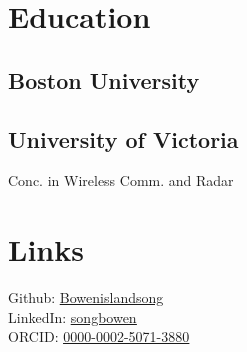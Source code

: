 \documentclass[]{deedy-resume-openfont}
\begin{document}
%
%
\lastupdated

%
%



%
%

\begin{minipage}[t]{0.33\textwidth} 


\section{Education} 

\subsection{Boston University}

\sectionsep

\subsection{University of Victoria}
Conc. in Wireless Comm. and Radar\\
\sectionsep


\section{Links} 
Github: \href{https://github.com/Bowenislandsong}{\underline{Bowenislandsong}} \\
LinkedIn: \href{https://www.linkedin.com/in/songbowen/}{\underline{songbowen}} \\
ORCID: \href{https://orcid.org/0000-0002-5071-3880}{\underline{0000-0002-5071-3880}}


\end{minipage}
\end{document}
